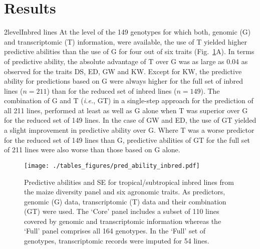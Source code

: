 \documentclass[12pt,titlepage]{article}
\begin{document}
\section*{Results}
\Genetics2level{Inbred lines}
At the level of the 149 genotypes for which both, genomic (G) and 
transcriptomic (T) information, were available, the use of T yielded higher
predictive abilities than the use of G for four out of six traits
(Fig.~\ref{fig:InbredResults}A).
In terms of predictive ability, the absolute advantage of T over G was as large 
as 0.04 as observed for the traits DS, ED, GW and KW\@.
Except for KW, the predictive ability for predictions based on G were always
higher for the full set of inbred lines ($n = 211$) than for the reduced set of 
inbred lines ($n = 149$).
The combination of G and T (\textit{i.e.}, GT) in a single-step approach for the 
prediction of all 211 lines, performed at least as well as G alone when T was 
superior over G for the reduced set of 149 lines.
In the case of GW and ED, the use of GT yielded a slight improvement in predictive 
ability over G.
Where T was a worse predictor for the reduced set of 149 lines than G,
predictive abilities of GT for the full set of 211 lines were also worse than 
those based on G alone.

\begin{figure}[H]
  \centering
  \texttt{[image: ./tables\_figures/pred\_ability\_inbred.pdf]}
  \caption{
  Predictive abilities and SE for tropical/subtropical inbred lines from the 
  maize diversity panel and six agronomic traits.
  As predictors, genomic (G) data, transcriptomic (T) data and their 
  combination (GT) were used.
  The `Core' panel includes a subset of 110 lines covered by genomic and
  transcriptomic information whereas the `Full' panel comprises all 164
  genotypes.
  In the `Full' set of genotypes, transcriptomic records were imputed for 54
  lines.
  }
\label{fig:InbredResults}
\end{figure}
\end{document}
